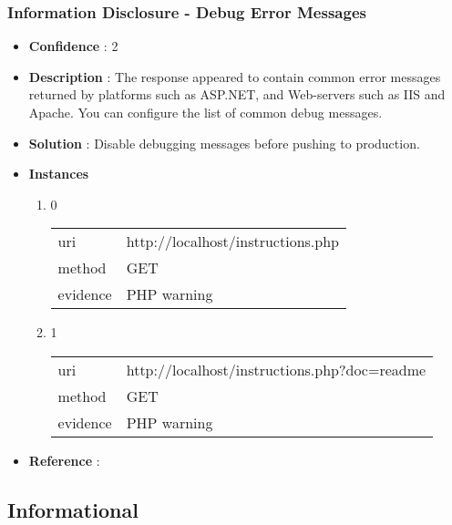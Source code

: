 \documentclass[10pt]{article}
\begin{document}
\subsubsection{Information Disclosure - Debug Error Messages}
\begin{itemize}
\item[] \textbf{Confidence} : 2
\item[] \textbf{Description} : The response appeared to contain common error messages returned by platforms such as ASP.NET, and Web-servers such as IIS and Apache. You can configure the list of common debug messages.
\item[] \textbf{Solution} :  Disable debugging messages before pushing to production.
\item[] \textbf{Instances}
\begin{enumerate}
\item[] 0
\begin{tabular}{| l | p{12cm}}
uri & http://localhost/instructions.php \\
method & GET \\
evidence & PHP warning \\
\end{tabular}
\item[] 1
\begin{tabular}{| l | p{12cm}}
uri & http://localhost/instructions.php?doc=readme \\
method & GET \\
evidence & PHP warning \\
\end{tabular}
\end{enumerate}
\item[] \textbf{Reference} : 
\end{itemize}
\subsection{Informational}
\end{document}
